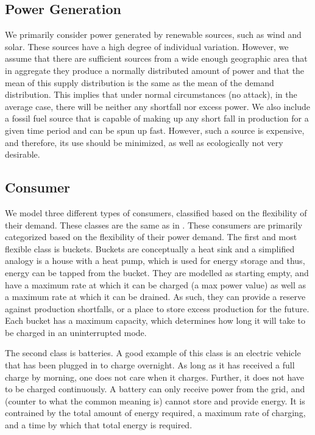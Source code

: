 \documentclass[conference]{IEEEtran}
\begin{document}
\subsection{Power Generation}
\label{Power Generation}

We primarily consider power generated by renewable sources, such as wind and solar. These sources have a high degree of individual variation. However, we assume that there are sufficient sources from a wide enough geographic area that in aggregate they produce a normally distributed amount of power and that the mean of this supply distribution is the same as the mean of the demand distribution. This implies that under normal circumstances (no attack), in the average case, there will be neither any shortfall nor excess power. We also include a fossil fuel source that is capable of making up any short fall in production for a given time period and can be spun up fast. However, such a source is expensive, and therefore, its use should be minimized, as well as ecologically not very desirable. 

\subsection{Consumer}
\label{Consumer}

We model three different types of consumers, classified based on the flexibility of their demand. These classes are the same as in \cite{petersen2013taxonomy}. These consumers are primarily categorized based on the flexibility of their power demand. 
The first and most flexible class is buckets. Buckets are conceptually a heat sink and 
a simplified analogy is a house with a heat pump, which is used for energy storage and thus, energy can be tapped from the bucket. They are modelled as starting empty, and have a maximum rate at which it can be charged (a max power value) as well as a maximum rate at which it can be drained. As such, they can provide a reserve against production shortfalls, or a place to store excess production for the future. Each bucket has a maximum capacity, which determines how long it will take to be charged in an uninterrupted mode. 

The second class is batteries. A good example of this class is an electric vehicle that has been plugged in to charge overnight. As long as it has received a full charge by morning, one does not care when it charges. Further, it does not have to be charged continuously. A battery can only receive power from the grid, and (counter to what the common meaning is) cannot store and provide energy. It is contrained by the total amount of energy required, a maximum rate of charging, and a time by which that total energy is required.
\end{document}
